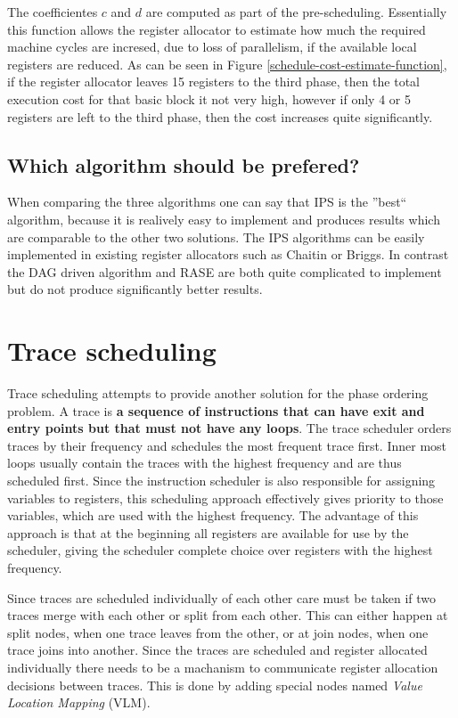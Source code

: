 \documentclass[a4paper,10pt]{article}
\begin{document}
The coefficientes $c$ and $d$ are computed as part of the pre-scheduling. Essentially this function allows the register allocator to 
estimate how much the required machine cycles are incresed, due to loss of parallelism, if the available local registers are reduced.
As can be seen in Figure \ref{schedule-cost-estimate-function}, if the register allocator leaves 15 registers to the third phase,
then the total execution cost for that basic block it not very high, however if only 4 or 5 registers are left to the third phase,
then the cost increases quite significantly.

\subsection{Which algorithm should be prefered?}
When comparing the three algorithms one can say that IPS is the ''best`` 
algorithm, because it is realively easy to implement and produces results which are comparable to the other two solutions. The IPS 
algorithms can be easily implemented in existing register allocators such as Chaitin or Briggs. In contrast the DAG driven algorithm and 
RASE are both quite complicated to implement but do not produce significantly better results.

\section{Trace scheduling}
Trace scheduling attempts to provide another solution for the phase ordering problem. A trace is \textbf{a sequence of instructions that 
can have exit and entry points but that must not have any loops}. The trace 
scheduler orders traces by their frequency and schedules the most frequent trace first. Inner most loops usually contain 
the traces with the highest frequency and are thus scheduled first. Since the instruction scheduler is also responsible for assigning 
variables to registers, this scheduling approach effectively gives priority to those variables, which are used with the highest frequency.
The advantage of this approach is that at the beginning all registers are available for use by the scheduler, giving the scheduler 
complete choice over registers with the highest frequency.

Since traces are scheduled individually of each other care must be taken if two traces merge with each other or split from each other.
This can either happen at split nodes, when one trace leaves from the other, or at join nodes, when one trace joins into another. Since 
the traces are scheduled and register allocated individually there needs to be a machanism to communicate register allocation decisions
between traces. This is done by adding special nodes named \textit{Value Location Mapping} (VLM).
\end{document}
